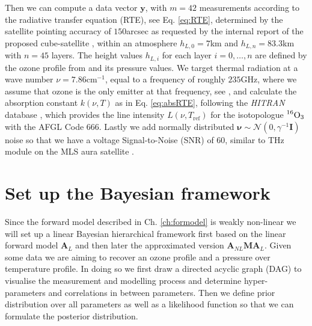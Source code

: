 Then we can compute a data vector $\bm{y}$, with $m = 42$ measurements according to the radiative transfer equation (RTE), see Eq. \ref{eq:RTE}, determined by the satellite pointing accuracy of $150$arcsec as requested by the internal report of the proposed cube-satellite \cite{CubeSatInternal}, within an atmosphere $h_{L,0}=7$km and $h_{L,n} = 83.3$km with $n = 45$ layers.
The height values $h_{L,i}$ for each layer $i = 0,\dots, n$ are defined by the ozone profile from \cite{MLSdata} and its pressure values.
We target thermal radiation at a wave number $\nu = 7.86\text{cm}^{-1}$, equal to a frequency of roughly $235$GHz, where we assume that ozone is the only emitter at that frequency, see \cite{}, and calculate the absorption constant $k(\nu,T)$ as in Eq. \ref{eq:absRTE}, following the \textit{HITRAN} database \cite{gordon2022hitran2020}, which provides the line intensity $L(\nu,T_{\text{ref}})$ for the isotopologue $\prescript{16}{}{\text{O}}_3$ with the AFGL Code 666.
Lastly we add normally distributed $\bm{\nu} \sim \mathcal{N}(0,\gamma^{-1} \bm{I})$ noise so that we have a voltage Signal-to-Noise (SNR) of $60$, similar to THz module on the MLS aura satellite \cite{pickett2006snr}.


\section{Set up the Bayesian framework}
\label{sec:BayModel}
Since the forward model described in Ch. \ref{ch:formodel} is weakly non-linear we will set up a linear Bayesian hierarchical framework first based on the linear forward model $\bm{A}_L$ and then later the approximated version $\bm{A}_{NL}\bm{M} \bm{A}_L$.
Given some data we are aiming to recover an ozone profile and a pressure over temperature profile.
In doing so we first draw a directed acyclic graph (DAG) to visualise the measurement and modelling process and determine hyper-parameters and correlations in between parameters.
Then we define prior distribution over all parameters as well as a likelihood function so that we can formulate the posterior distribution.

